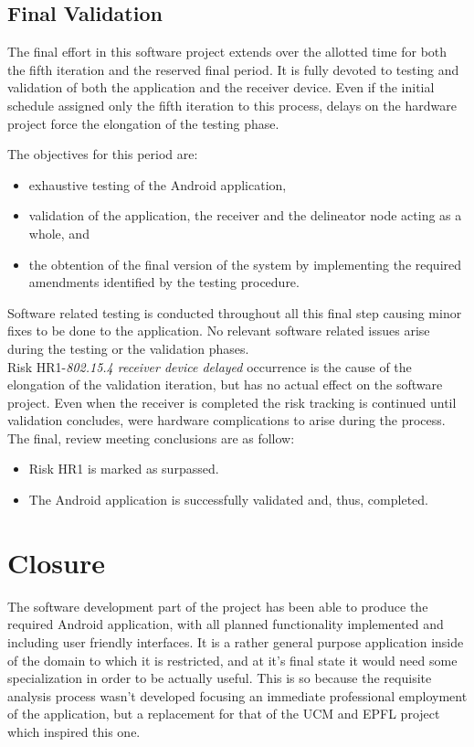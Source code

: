 		\subsection{Final Validation}
			The final effort in this software project extends over the allotted time for both the fifth iteration and the reserved final period. It is fully devoted to testing and validation of both the application and the receiver device. Even if the initial schedule assigned only the fifth iteration to this process, delays on the hardware project force the elongation of the testing phase.

			The objectives for this period are:
			\begin{itemize}
				\item exhaustive testing of the Android application,
				\item validation of the application, the receiver and the delineator node acting as a whole, and
				\item the obtention of the final version of the system by implementing the required amendments identified by the testing procedure.
			\end{itemize}

			Software related testing is conducted throughout all this final step causing minor fixes to be done to the application. No relevant software related issues arise during the testing or the validation phases.\\

			Risk HR1-\emph{802.15.4 receiver device delayed} occurrence is the cause of the elongation of the validation iteration, but has no actual effect on the software project. Even when the receiver is completed the risk tracking is continued until validation concludes, were hardware complications to arise during the process.\\

			The final, review meeting conclusions are as follow:
			\begin{itemize}
				\item Risk HR1 is marked as surpassed.
				\item The Android application is successfully validated and, thus, completed.
			\end{itemize}
			
	\section{Closure}
	\label{sec:sw-ending}

		The software development part of the project has been able to produce the required Android application, with all planned functionality implemented and including user friendly interfaces. It is a rather general purpose application inside of the domain to which it is restricted, and at it's final state it would need some specialization in order to be actually useful. This is so because the requisite analysis process wasn't developed focusing an immediate professional employment of the application, but a replacement for that of the UCM and EPFL project which inspired this one. \\

